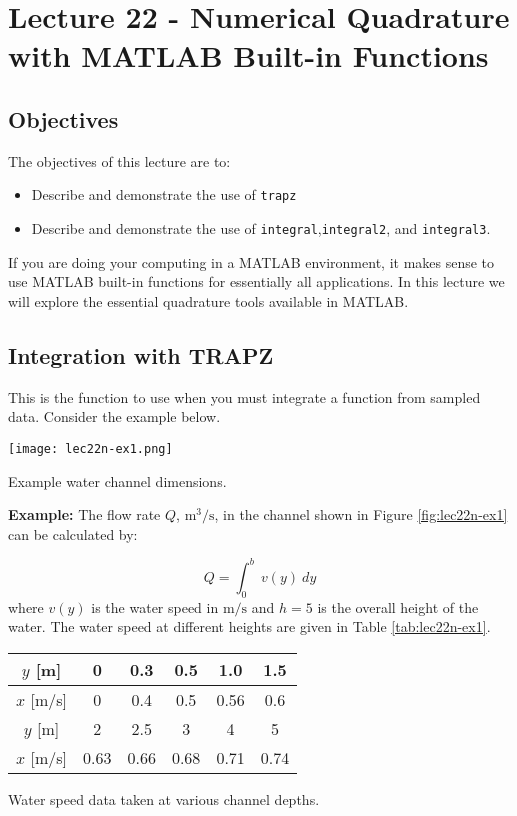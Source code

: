 \chapter{Lecture 22 - Numerical Quadrature with MATLAB Built-in Functions}
\label{ch:lec22n}
\section{Objectives}
The objectives of this lecture are to:
\begin{itemize}
\item Describe and demonstrate the use of \lstinline[style=myMatlab]{trapz}
\item Describe and demonstrate the use of \lstinline[style=myMatlab]{integral},\lstinline[style=myMatlab]{integral2}, and \lstinline[style=myMatlab]{integral3}.
\end{itemize}
\setcounter{lstannotation}{0}

If you are doing your computing in a MATLAB environment, it makes sense to use MATLAB built-in functions for essentially all applications.  In this lecture we will explore the essential quadrature tools available in MATLAB.

\section{Integration with TRAPZ}
This is the function to use when you must integrate a function from sampled data.  Consider the example below.

\begin{marginfigure}
\texttt{[image: lec22n-ex1.png]}
\caption{Example water channel dimensions.}
\label{fig:lec22n-ex1}
\end{marginfigure}

\vspace{0.25cm}

\noindent\textbf{Example:} The flow rate $Q$, $\text{m}^3/\text{s}$, in the channel shown in Figure \ref{fig:lec22n-ex1} can be calculated by:

\begin{equation*}
Q = \int_{0}^{b} \ v(y) \ dy
\end{equation*}
where $v(y)$ is the water speed in $\text{m}/\text{s}$ and $h=5$ is the overall height of the water.  The water speed at different heights are given in Table \ref{tab:lec22n-ex1}.
\begin{margintable}
\begin{tabular}{|c|c|c|c|c|c|}
\hline
$y$ [m] & 0 & 0.3 & 0.5 & 1.0 & 1.5 \\ \hline
$x$ [m/s] & 0 & 0.4 & 0.5 & 0.56 & 0.6 \\ \hline
$y$ [m] & 2 & 2.5 & 3 & 4 & 5 \\ \hline
$x$ [m/s] & 0.63 & 0.66 & 0.68 & 0.71 & 0.74 \\ \hline
\end{tabular}
\caption{Water speed data taken at various channel depths.}
\label{tab:lec22n-ex1}
\end{margintable}

